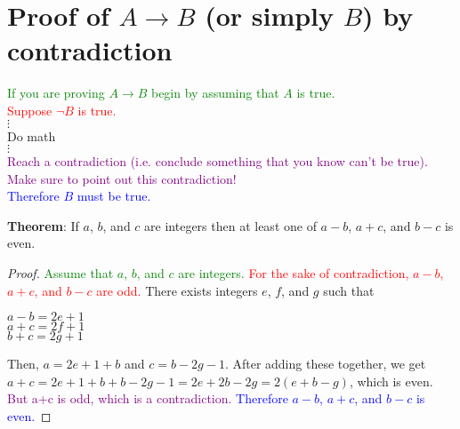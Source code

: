 \documentclass[11pt, oneside]{article}
\begin{document}
\newpage
\section{Proof of $A \rightarrow B$ (or simply $B$) by contradiction}

		\begin{center}
		\textcolor{green}{If you are proving $A \rightarrow B$ begin by assuming that $A$ is true.}\\
		\textcolor{red}{Suppose $\neg B$ is true.} \\
		 $\vdots$ \\ Do math \\ $\vdots$ \\
		 \textcolor{purple}{Reach a contradiction (i.e. conclude something that you know can't be true).\\  Make sure to point out this contradiction!}\\
		 \textcolor{blue}{Therefore $B$ must be true.}\\[0.2in] 
		 \end{center}
		 
  \noindent \textbf{Theorem}:    If $a$, $b$, and $c$ are integers then at least one of $a-b$, $a+c$, and $b-c$ is even. 
 
 \begin{proof}
		\textcolor{green}{Assume that $a$, $b$, and $c$ are integers.}
		\textcolor{red}{For the sake of contradiction, $a-b$, $a+c$, and $b-c$ are odd.}
		There exists integers $e$, $f$, and $g$ such that 
		\begin{center}
		$a-b=2e+1$
		\\$a+c=2f+1$\\
		$b+c=2g+1$
		\end{center}
		Then, $a=2e+1+b$ and $c=b-2g-1$. After adding these together, we get $a+c=2e+1+b+b-2g-1=2e+2b-2g=2(e+b-g)$, which is even.
		\textcolor{purple}{But a+c is odd, which is a contradiction.}
		\textcolor{blue}{Therefore $a-b$, $a+c$, and $b-c$ is even.}\end{proof} 
		
		 \newpage
 
  
\end{document}
